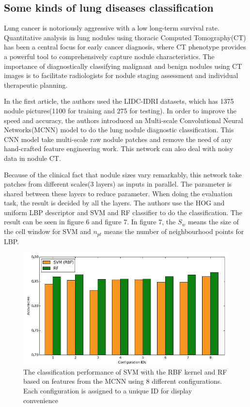 \documentclass[10pt,twocolumn,letterpaper]{article}
\begin{document}
\subsection{Some kinds of lung diseases classification}

Lung cancer is notoriously aggressive with a low long-term survival rate. Quantitative analysis in lung nodules using thoracic Computed Tomography(CT) has been a central focus for early cancer diagnosis, where CT phenotype provides a powerful tool to comprehensively capture nodule characteristics. The importance of diagnostically classifying malignant and benign nodules using CT images is to facilitate radiologists for nodule staging assessment and individual therapeutic planning.\cite{shen2015multi}

In the first article\cite{shen2015multi}, the authors used the LIDC-IDRI datasets, which has 1375 nodule pictures(1100 for training and 275 for testing). In order to improve the speed and accuracy, the authors introduced an Multi-scale Convolutional Neural Networks(MCNN) model to do the lung nodule diagnostic classification. This CNN model take multi-scale raw nodule patches and remove the need of any hand-crafted feature engineering work. This network can also deal with noisy data in nodule CT.

Because of the clinical fact that nodule sizes vary remarkably, this network take patches from different scales(3 layers) as inputs in parallel. The parameter is shared between these layers to reduce parameter. When doing the evaluation task, the result is decided by all the layers. The authors use the HOG and uniform LBP descriptor and SVM and RF classifier to do the classification. The result can be seen in figure 6 and figure 7. In figure 7, the \textit{$S_w$} means the size of the cell window for SVM and \textit{$n_{pt}$} means the number of neighbourhood points for LBP.

\begin{figure}[t]
	\begin{center}
		\includegraphics[width=0.8\linewidth]{9}
	\end{center}
	\caption{The classification performance of SVM with the RBF kernel and RF based on features from the MCNN using 8 different configurations. Each configuration is assigned to a unique ID for display convenience} 
	\label{fig:long}
	\label{fig:onecol}
\end{figure}
\end{document}
